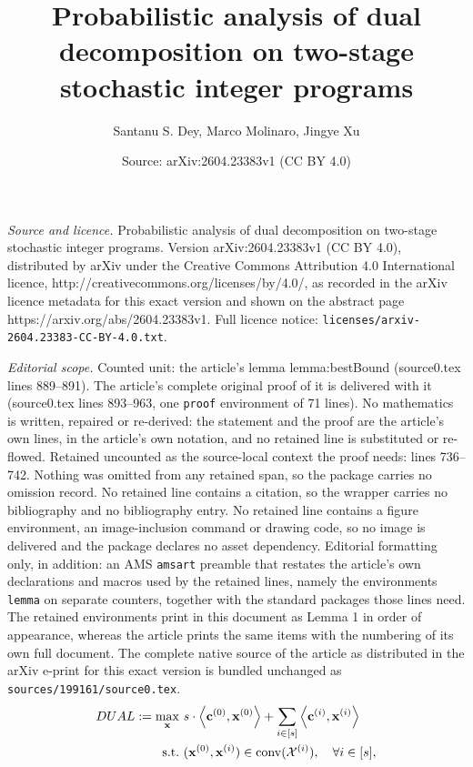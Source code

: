 \documentclass[10pt,a4paper]{amsart}
\title{Probabilistic analysis of dual decomposition on two-stage stochastic integer programs}
\author{Santanu S. Dey, Marco Molinaro, Jingye Xu}
\date{Source: arXiv:2604.23383v1 (CC BY 4.0)}
\newcommand{\LAG}{\textup{DUAL}}
\DeclareMathOperator{\conv}{\operatorname{conv}}
\newcommand{\cv}[0]{\mathbf{c}}
\newcommand{\iprod}[2]{\left\langle {#1}, {#2} \right\rangle}
\newcommand{\xv}[0]{\mathbf{x}}
\begin{document}
\maketitle

\noindent\emph{Source and licence.} Probabilistic analysis of dual decomposition on two-stage stochastic integer programs. Version arXiv:2604.23383v1 (CC BY 4.0), distributed by arXiv under the Creative Commons Attribution 4.0 International licence, http://creativecommons.org/licenses/by/4.0/, as recorded in the arXiv licence metadata for this exact version and shown on the abstract page https://arxiv.org/abs/2604.23383v1. Full licence notice: \texttt{licenses/arxiv-2604.23383-CC-BY-4.0.txt}.\par\smallskip

\noindent\textit{Editorial scope.} Counted unit: the article's lemma lemma:bestBound (source0.tex lines 889--891). The article's complete original proof of it is delivered with it (source0.tex lines 893--963, one \texttt{proof} environment of 71 lines). No mathematics is written, repaired or re-derived: the statement and the proof are the article's own lines, in the article's own notation, and no retained line is substituted or re-flowed.  Retained uncounted as the source-local context the proof needs: lines 736--742.  Nothing was omitted from any retained span, so the package carries no omission record.  No retained line contains a citation, so the wrapper carries no bibliography and no bibliography entry.  No retained line contains a figure environment, an image-inclusion command or drawing code, so no image is delivered and the package declares no asset dependency.  Editorial formatting only, in addition: an AMS \texttt{amsart} preamble that restates the article's own declarations and macros used by the retained lines, namely the environments \texttt{lemma} on separate counters, together with the standard packages those lines need.  The retained environments print in this document as Lemma 1 in order of appearance, whereas the article prints the same items with the numbering of its own full document.  The complete native source of the article as distributed in the arXiv e-print for this exact version is bundled unchanged as \texttt{sources/199161/source0.tex}.
\begin{equation}
    \label{eq:lagrelax}
    \begin{aligned}
    \LAG := \max_{\xv} \ & s \cdot \iprod{\cv^{(0)}}{\xv^{(0)}} + \sum_{i \in [s]} \iprod{\cv^{(i)}}{\xv^{(i)}} \\
    \text{s.t.}\ & (\xv^{(0)}, \xv^{(i)}) \in \conv(\mathcal{X}^{(i)}), \quad \forall i \in [s],
    \end{aligned}
\end{equation}
\end{document}
